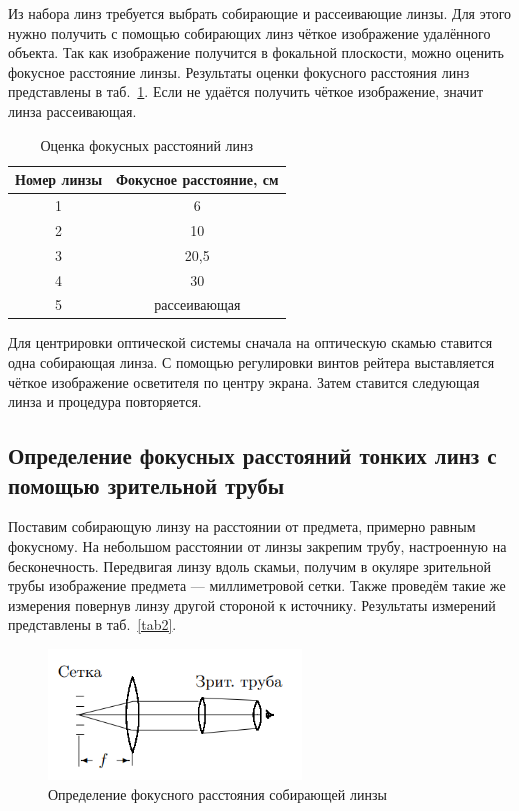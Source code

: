 \documentclass[a4paper, 12pt]{article}
\begin{document}
Из набора линз требуется выбрать собирающие и рассеивающие линзы. Для этого нужно получить с помощью собирающих линз чёткое изображение удалённого объекта. Так как изображение получится в фокальной плоскости, можно оценить фокусное расстояние линзы. Результаты оценки фокусного расстояния линз представлены в таб.~\ref{tab1}. Если не удаётся получить чёткое изображение, значит линза рассеивающая.

\begin{table}[h!]
\begin{center}
\begin{tabular}{|c|c|}
\hline 
Номер линзы & Фокусное расстояние, см \\ 
\hline 
1 & 6 \\ 
\hline 
2 & 10 \\ 
\hline 
3 & 20,5 \\ 
\hline 
4 & 30 \\ 
\hline
5 & рассеивающая \\
\hline
\end{tabular} 
\end{center}
\caption{Оценка фокусных расстояний линз}
\label{tab1}
\end{table}

Для центрировки оптической системы сначала на оптическую скамью ставится одна собирающая линза. С помощью регулировки винтов рейтера выставляется чёткое изображение осветителя по центру экрана. Затем ставится следующая линза и процедура повторяется.

\subsection{Определение фокусных расстояний тонких линз с помощью зрительной трубы}

Поставим собирающую линзу на расстоянии от предмета, примерно равным фокусному. На небольшом расстоянии от линзы закрепим трубу, настроенную на бесконечность. Передвигая линзу вдоль скамьи, получим  в окуляре зрительной трубы изображение предмета --- миллиметровой сетки. Также проведём такие же измерения повернув линзу другой стороной к источнику. Результаты измерений представлены в таб.~\ref{tab2}.

\begin{figure}[h!]
\begin{center}
	\includegraphics[width=0.6\textwidth]{plus_lens.png}
\end{center}
\caption{Определение фокусного расстояния собирающей линзы}
\label{fig:plus_lens}
\end{figure}
\end{document}
